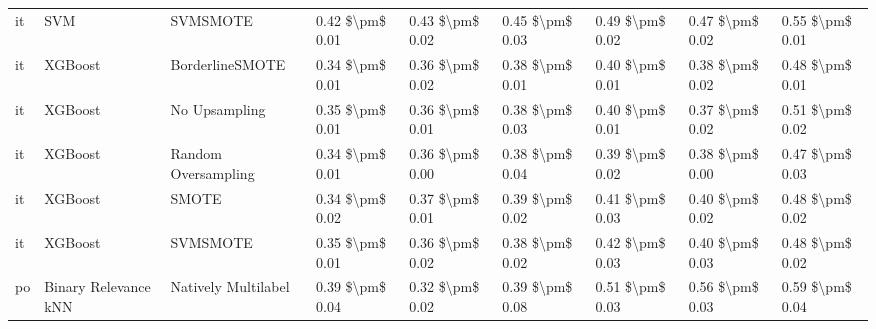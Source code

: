 \begin{tabular}{lllllllll}
      it &                             SVM &                      SVMSMOTE & 0.42 \$\textbackslash pm\$ 0.01 &           0.43 \$\textbackslash pm\$ 0.02 &       0.45 \$\textbackslash pm\$ 0.03 &        0.49 \$\textbackslash pm\$ 0.02 &                         0.47 \$\textbackslash pm\$ 0.02 &     0.55 \$\textbackslash pm\$ 0.01 \\
      it &                         XGBoost &               BorderlineSMOTE & 0.34 \$\textbackslash pm\$ 0.01 &           0.36 \$\textbackslash pm\$ 0.02 &       0.38 \$\textbackslash pm\$ 0.01 &        0.40 \$\textbackslash pm\$ 0.01 &                         0.38 \$\textbackslash pm\$ 0.02 &     0.48 \$\textbackslash pm\$ 0.01 \\
      it &                         XGBoost &                 No Upsampling & 0.35 \$\textbackslash pm\$ 0.01 &           0.36 \$\textbackslash pm\$ 0.01 &       0.38 \$\textbackslash pm\$ 0.03 &        0.40 \$\textbackslash pm\$ 0.01 &                         0.37 \$\textbackslash pm\$ 0.02 &     0.51 \$\textbackslash pm\$ 0.02 \\
      it &                         XGBoost &           Random Oversampling & 0.34 \$\textbackslash pm\$ 0.01 &           0.36 \$\textbackslash pm\$ 0.00 &       0.38 \$\textbackslash pm\$ 0.04 &        0.39 \$\textbackslash pm\$ 0.02 &                         0.38 \$\textbackslash pm\$ 0.00 &     0.47 \$\textbackslash pm\$ 0.03 \\
      it &                         XGBoost &                         SMOTE & 0.34 \$\textbackslash pm\$ 0.02 &           0.37 \$\textbackslash pm\$ 0.01 &       0.39 \$\textbackslash pm\$ 0.02 &        0.41 \$\textbackslash pm\$ 0.03 &                         0.40 \$\textbackslash pm\$ 0.02 &     0.48 \$\textbackslash pm\$ 0.02 \\
      it &                         XGBoost &                      SVMSMOTE & 0.35 \$\textbackslash pm\$ 0.01 &           0.36 \$\textbackslash pm\$ 0.02 &       0.38 \$\textbackslash pm\$ 0.02 &        0.42 \$\textbackslash pm\$ 0.03 &                         0.40 \$\textbackslash pm\$ 0.03 &     0.48 \$\textbackslash pm\$ 0.02 \\
      po &            Binary Relevance kNN &           Natively Multilabel & 0.39 \$\textbackslash pm\$ 0.04 &           0.32 \$\textbackslash pm\$ 0.02 &       0.39 \$\textbackslash pm\$ 0.08 &        0.51 \$\textbackslash pm\$ 0.03 &                         0.56 \$\textbackslash pm\$ 0.03 &     0.59 \$\textbackslash pm\$ 0.04 \\

\end{tabular}
